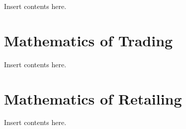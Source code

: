 \documentclass[
]{book}
\begin{document}
Insert contents here.

\hypertarget{mathematics-of-trading}{%
\chapter{Mathematics of Trading}\label{mathematics-of-trading}}

Insert contents here.

\hypertarget{mathematics-of-retailing}{%
\chapter{Mathematics of Retailing}\label{mathematics-of-retailing}}

Insert contents here.

  
\end{document}
